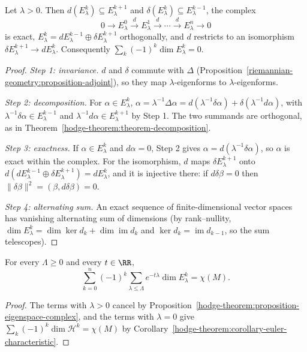 \begin{proposition}\label{hodge-theorem:proposition-eigenspace-complex}
Let $\lambda > 0$. Then $d(E^k_\lambda) \subseteq E^{k+1}_\lambda$ and $\delta(E^k_\lambda) \subseteq E^{k-1}_\lambda$, the complex
\[
0 \to E^0_\lambda \xrightarrow{d} E^1_\lambda \xrightarrow{d} \cdots \xrightarrow{d} E^n_\lambda \to 0
\]
is exact, $E^k_\lambda = dE^{k-1}_\lambda \oplus \delta E^{k+1}_\lambda$ orthogonally, and $d$ restricts to an isomorphism $\delta E^{k+1}_\lambda \to dE^k_\lambda$. Consequently $\sum_k(-1)^k\dim E^k_\lambda = 0$.
\end{proposition}

\begin{proof}
\emph{Step 1: invariance.} $d$ and $\delta$ commute with $\Delta$ (Proposition~\ref{riemannian-geometry:proposition-adjoint}), so they map $\lambda$-eigenforms to $\lambda$-eigenforms.

\emph{Step 2: decomposition.} For $\alpha \in E^k_\lambda$, $\alpha = \lambda^{-1}\Delta\alpha = d(\lambda^{-1}\delta\alpha) + \delta(\lambda^{-1}d\alpha)$, with $\lambda^{-1}\delta\alpha \in E^{k-1}_\lambda$ and $\lambda^{-1}d\alpha \in E^{k+1}_\lambda$ by
Step 1. The two summands are orthogonal, as in Theorem~\ref{hodge-theorem:theorem-decomposition}.

\emph{Step 3: exactness.} If $\alpha \in E^k_\lambda$ and $d\alpha = 0$, Step 2 gives $\alpha = d(\lambda^{-1}\delta\alpha)$, so $\alpha$ is exact within the complex. For the isomorphism, $d$ maps $\delta E^{k+1}_\lambda$ onto
$d(dE^{k-1}_\lambda \oplus \delta E^{k+1}_\lambda) = dE^k_\lambda$, and it is injective there: if $d\delta\beta = 0$ then $\|\delta\beta\|^2 = (\beta, d\delta\beta) = 0$.

\emph{Step 4: alternating sum.} An exact sequence of finite-dimensional vector spaces has vanishing alternating sum of dimensions (by rank--nullity, $\dim E^k_\lambda = \dim\ker d_k + \dim\operatorname{im}d_k$
and $\ker d_k = \operatorname{im}d_{k-1}$, so the sum telescopes).
\end{proof}

\begin{corollary}\label{hodge-theorem:corollary-mckean-singer}
For every $\Lambda \geq 0$ and every $t \in \RR$,
\[
\sum_{k=0}^n(-1)^k\sum_{\lambda \leq \Lambda}e^{-t\lambda}\dim E^k_\lambda = \chi(M).
\]
\end{corollary}

\begin{proof}
The terms with $\lambda > 0$ cancel by Proposition~\ref{hodge-theorem:proposition-eigenspace-complex}, and the terms with $\lambda = 0$ give $\sum_k(-1)^k\dim\mathcal{H}^k = \chi(M)$ by
Corollary~\ref{hodge-theorem:corollary-euler-characteristic}.
\end{proof}

